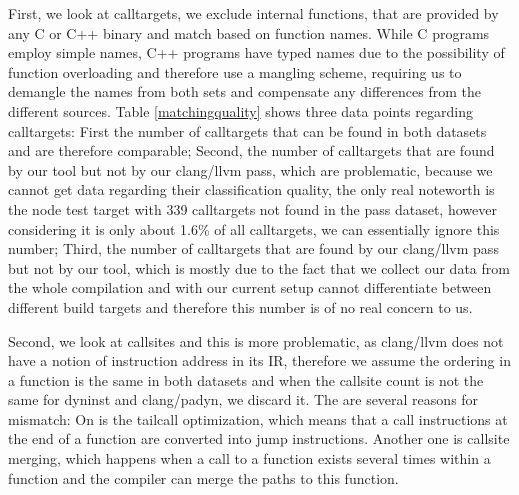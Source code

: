 First, we look at calltargets, we exclude internal functions, that are provided by any C or C++ binary and match based on function names. While C programs employ simple names, C++ programs have typed names due to the possibility of function overloading and therefore use a mangling scheme, requiring us to demangle the names from both sets and compensate any differences from the different sources. Table \ref{matchingquality} shows three data points regarding calltargets: First the number of calltargets that can be found in both datasets and are therefore comparable; Second, the number of calltargets that are found by our tool but not by our clang/llvm pass, which are problematic, because we cannot get data regarding their classification quality, the only real noteworth is the node test target with 339 calltargets not found in the pass dataset, however considering it is only about 1.6\% of all calltargets, we can essentially ignore this number; Third, the number of calltargets that are found by our clang/llvm pass but not by our tool, which is mostly due to the fact that we collect our data from the whole compilation and with our current setup cannot differentiate between different build targets and therefore this number is of no real concern to us.

Second, we look at callsites and this is more problematic, as clang/llvm does not have a notion of instruction address in its IR, therefore we assume the ordering in a function is the same in both datasets and when the callsite count is not the same for dyninst and clang/padyn, we discard it. The are several reasons for mismatch: On is the tailcall optimization, which means that a call instructions at the end of a function are converted into jump instructions. Another one is callsite merging, which happens when a call to a function exists several times within a function and the compiler can merge the paths to this function.

\begin{table}
		\caption {Table shows the quality of structural matching provided by our automated verify and test environment, regarding callsites and calltargets. Missmatches are basically the result of discrepancies between llvm/IR and the actual binary  }
	\label{tbl:matchingquality}
\end{table}


